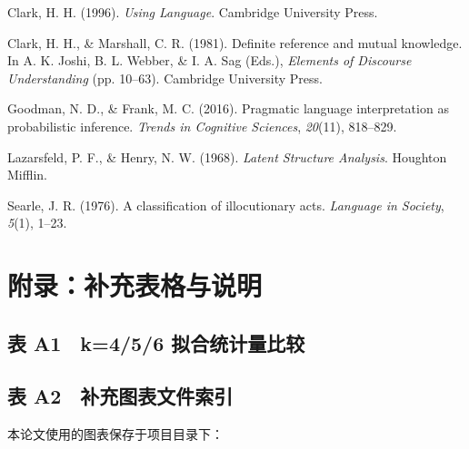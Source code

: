 \documentclass[12pt,a4paper,openany,oneside]{ctexrep}
\begin{document}
Clark, H. H. (1996). \emph{Using Language}. Cambridge University Press.

Clark, H. H., \& Marshall, C. R. (1981). Definite reference and mutual knowledge. In A. K. Joshi, B. L. Webber, \& I. A. Sag (Eds.), \emph{Elements of Discourse Understanding} (pp. 10–63). Cambridge University Press.

Goodman, N. D., \& Frank, M. C. (2016). Pragmatic language interpretation as probabilistic inference. \emph{Trends in Cognitive Sciences}, \emph{20}(11), 818–829.

Lazarsfeld, P. F., \& Henry, N. W. (1968). \emph{Latent Structure Analysis}. Houghton Mifflin.

Searle, J. R. (1976). A classification of illocutionary acts. \emph{Language in Society}, \emph{5}(1), 1–23.

\section{附录：补充表格与说明}


\subsection{表 A1　k=4/5/6 拟合统计量比较}


\begin{table}[htbp]
\centering
\caption{表 A1：k=4/5/6 拟合统计量比较}
\small
{}
\end{table}

\subsection{表 A2　补充图表文件索引}


本论文使用的图表保存于项目目录下：
\end{document}
